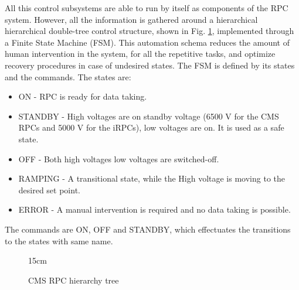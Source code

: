 All this control subsystems are able to run by itself as components of the RPC system. However, all the information is gathered around a hierarchical hierarchical double-tree control structure, shown in Fig. \ref{fig:RPC_DCS_structure}, implemented through a Finite State Machine (FSM). This automation schema reduces the amount of human intervention in the system, for all the repetitive tasks, and optimize recovery procedures in case of undesired states. The FSM is defined by its states and the commands. The states are:
\begin{itemize}
    \item ON - RPC is ready for data taking.
    \item STANDBY - High voltages are on standby voltage (6500 V for the CMS RPCs and 5000 V for the iRPCs), low voltages are on. It is used as a safe state.
    \item OFF - Both high voltages low voltages are switched-off.
    \item RAMPING - A transitional state, while the High voltage is moving to the desired set point.
    \item ERROR - A manual intervention is required and no data taking is possible.
\end{itemize}
The commands are ON, OFF and STANDBY, which effectuates the transitions to the states with same name.

\begin{figure}[!htm]{15cm}
\caption{CMS RPC hierarchy tree}%
\label{fig:RPC_DCS_structure}
\end{figure}

